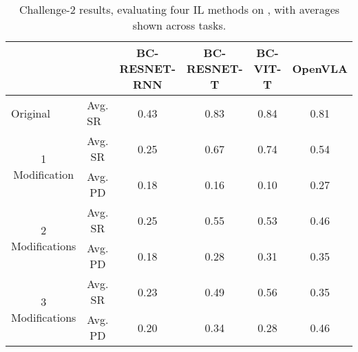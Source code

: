 \begin{table*}[ht]
\centering
\caption{Challenge-2 results, evaluating four IL methods on \taskoriginal, with averages shown across tasks.}
\label{tb:bm2_results}
\begin{tabular}{|c|c|c|c|c|c|}
\hline
                                 &                              & BC-RESNET-RNN & BC-RESNET-T & BC-VIT-T & OpenVLA \\ \hline
\multicolumn{1}{|l|}{Original}   & \multicolumn{1}{l|}{Avg. SR} & 0.43          & 0.83        & 0.84     & 0.81    \\ \hline
\multirow{2}{*}{1 Modification}  & Avg. SR                      & 0.25          & 0.67        & 0.74     & 0.54    \\ \cline{2-6} 
                                 & Avg. PD                      & 0.18          & 0.16        & 0.10     & 0.27    \\ \hline
\multirow{2}{*}{2 Modifications} & Avg. SR                      & 0.25          & 0.55        & 0.53     & 0.46    \\ \cline{2-6} 
                                 & Avg. PD                      & 0.18          & 0.28        & 0.31     & 0.35    \\ \hline
\multirow{2}{*}{3 Modifications} & Avg. SR                      & 0.23          & 0.49        & 0.56     & 0.35    \\ \cline{2-6} 
                                 & Avg. PD                      & 0.20          & 0.34        & 0.28     & 0.46    \\ \hline
\end{tabular}
\end{table*}
